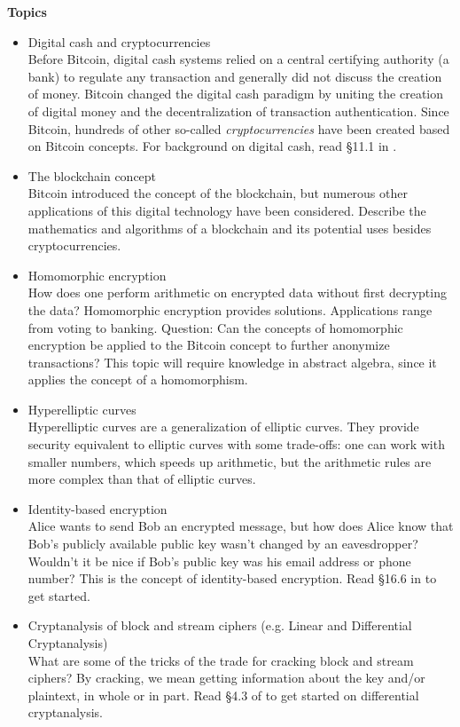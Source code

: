 {\bf Topics}
	\begin{itemize}
		\item Digital cash and cryptocurrencies\\
		Before Bitcoin, digital cash systems relied on a central certifying authority (a bank) to regulate any transaction and generally did not discuss the creation of money. Bitcoin changed the digital cash paradigm by uniting the creation of digital money and the decentralization of transaction authentication. Since Bitcoin, hundreds of other so-called {\em cryptocurrencies} have been created based on Bitcoin concepts. For background on digital cash, read \S 11.1 in \cite{tw}.
		\item{The blockchain concept}\\
		Bitcoin introduced the concept of the blockchain, but numerous other applications of this digital technology have been considered. Describe the mathematics and algorithms of a blockchain and its potential uses besides cryptocurrencies.
		\item{Homomorphic encryption}\\
		How does one perform arithmetic on encrypted data without first decrypting the data? Homomorphic encryption provides solutions. Applications range from voting to banking. Question: Can the concepts of homomorphic encryption be applied to the Bitcoin concept to further anonymize transactions? This topic will require knowledge in abstract algebra, since it applies the concept of a homomorphism.
		\item{Hyperelliptic curves}\\
		Hyperelliptic curves are a generalization of elliptic curves. They provide security equivalent to elliptic curves with some trade-offs: one can work with smaller numbers, which speeds up arithmetic, but the arithmetic rules are more complex than that of elliptic curves.
		\item{Identity-based encryption}\\
		Alice wants to send Bob an encrypted message, but how does Alice know that Bob's publicly available public key wasn't changed by an eavesdropper? Wouldn't it be nice if Bob's public key was his email address or phone number? This is the concept of identity-based encryption. Read \S 16.6 in \cite{tw} to get started.
		\item{Cryptanalysis of block and stream ciphers (e.g. Linear and Differential Cryptanalysis)}\\
		What are some of the tricks of the trade for cracking block and stream ciphers? By cracking, we mean getting information about the key and/or plaintext, in whole or in part. Read \S 4.3 of \cite{tw} to get started on differential cryptanalysis.

\end{itemize}
